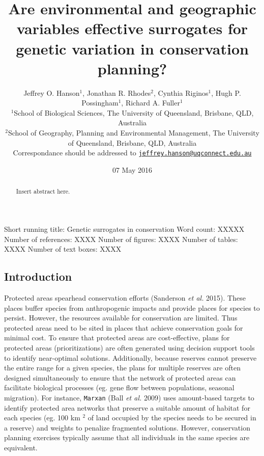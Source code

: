 \documentclass[11pt,]{article}
\title{Are environmental and geographic variables effective surrogates for
genetic variation in conservation planning?}
\author{Jeffrey O. Hanson\(^1\), Jonathan R. Rhodes\(^2\), Cynthia
Riginos\(^1\), Hugh P. Possingham\(^1\), Richard A. Fuller\(^1\)\\
\(^1\)School of Biological Sciences, The University of Queensland,
Brisbane, QLD, Australia\\
\(^2\)School of Geography, Planning and Environmental Management, The
University of Queensland, Brisbane, QLD, Australia\\
Correspondance should be addressed to
\href{mailto:jeffrey.hanson@uqconnect.edu.au}{\nolinkurl{jeffrey.hanson@uqconnect.edu.au}}}
\date{07 May 2016}
\begin{document}
\maketitle
\begin{abstract}
Insert abstract here.
\end{abstract}

Short running title: Genetic surrogates in conservation \newline
Word count: XXXXX \newline
Number of references: XXXX \newline
Number of figures: XXXX \newline
Number of tables: XXXX \newline
Number of text boxes: XXXX \newline
\newpage

\subsection{Introduction}\label{introduction}

Protected areas spearhead conservation efforts (Sanderson \emph{et al.}
2015). These places buffer species from anthropogenic impacts and
provide places for species to persist. However, the resources available
for conservation are limited. Thus protected areas need to be sited in
places that achieve conservation goals for minimal cost. To ensure that
protected areas are cost-effective, plans for protected areas
(prioritizations) are often generated using decision support tools to
identify near-optimal solutions. Additionally, because reserves cannot
preserve the entire range for a given species, the plans for multiple
reserves are often designed simultaneously to ensure that the network of
protected areas can facilitate biological processes (eg. gene flow
between populations, seasonal migration). For instance, \texttt{Marxan}
(Ball \emph{et al.} 2009) uses amount-based targets to identify
protected area networks that preserve a suitable amount of habitat for
each species (eg. 100 km \(^2\) of land occupied by the species needs to
be secured in a reserve) and weights to penalize fragmented solutions.
However, conservation planning exercises typically assume that all
individuals in the same species are equivalent.
\end{document}
